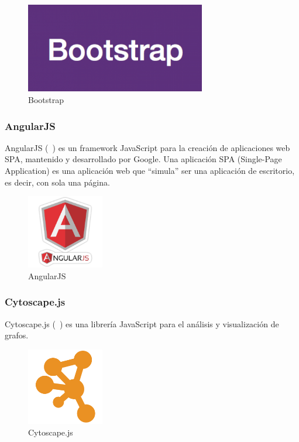 \begin{figure}[tbh]
\centering
\label{fig:bootstrap}
\includegraphics[width=0.7\textwidth]{imagenes/bootstrap}
\caption{Bootstrap}
\end{figure}

\subsubsection*{AngularJS}
AngularJS (~\cite{angular}) es un framework JavaScript para la creación de aplicaciones web SPA, mantenido y desarrollado por Google. Una aplicación SPA (Single-Page Application) es una aplicación web que ``simula'' ser una aplicación de escritorio, es decir, con sola una página.

\begin{figure}[tbh]
\centering
\label{fig:angular}
\includegraphics[width=0.3\textwidth]{imagenes/angular}
\caption{AngularJS}
\end{figure}

\subsubsection*{Cytoscape.js}

Cytoscape.js (~\cite{cytoscape}) es una librería JavaScript para el análisis y visualización de grafos.

\begin{figure}[tbh]
\centering
\label{fig:cytoscape}
\includegraphics[width=0.3\textwidth]{imagenes/cytoscape}
\caption{Cytoscape.js}
\end{figure}

